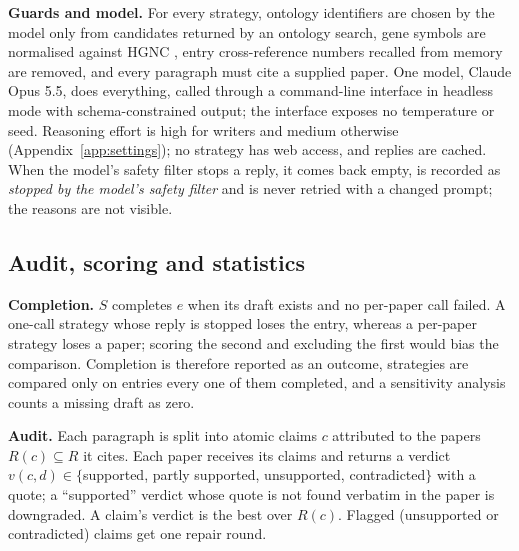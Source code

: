 \documentclass{article} %
\begin{document}
\textbf{Guards and model.} For every strategy, ontology identifiers are chosen by the model only from candidates returned by an ontology search, gene symbols are normalised against HGNC \citep{seal2023genenames}, entry cross-reference numbers recalled from memory are removed, and every paragraph must cite a supplied paper. One model, Claude Opus 5.5, does everything, called through a command-line interface in headless mode with schema-constrained output; the interface exposes no temperature or seed. Reasoning effort is high for writers and medium otherwise (Appendix~\ref{app:settings}); no strategy has web access, and replies are cached. When the model's safety filter stops a reply, it comes back empty, is recorded as \emph{stopped by the model's safety filter} and is never retried with a changed prompt; the reasons are not visible.

\subsection{Audit, scoring and statistics}
\label{sec:scoring}
\textbf{Completion.} $S$ completes $e$ when its draft exists and no per-paper call failed. A one-call strategy whose reply is stopped loses the entry, whereas a per-paper strategy loses a paper; scoring the second and excluding the first would bias the comparison. Completion is therefore reported as an outcome, strategies are compared only on entries every one of them completed, and a sensitivity analysis counts a missing draft as zero.

\textbf{Audit.} Each paragraph is split into atomic claims $c$ attributed to the papers $R(c)\subseteq R$ it cites. Each paper receives its claims and returns a verdict $v(c,d)\in\{$supported, partly supported, unsupported, contradicted$\}$ with a quote; a ``supported'' verdict whose quote is not found verbatim in the paper is downgraded. A claim's verdict is the best over $R(c)$. Flagged (unsupported or contradicted) claims get one repair round.
\end{document}
